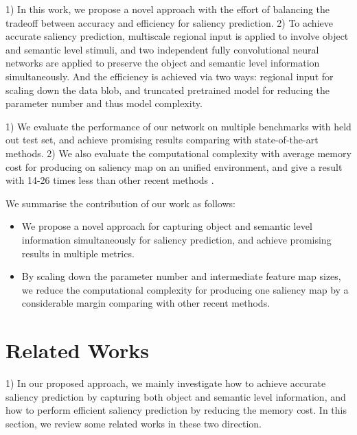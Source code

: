 \documentclass[twoside,twocolumn]{article}
\begin{document}
\par 1) In this work, we propose a novel approach with the effort of balancing the tradeoff between accuracy and efficiency for saliency prediction. 2) To achieve accurate saliency prediction, multiscale regional input is applied to involve object and semantic level stimuli, and two independent fully convolutional neural networks are applied to preserve the object and semantic level information simultaneously. And the efficiency is achieved via two ways: regional input for scaling down the data blob, and truncated pretrained model for reducing the parameter number and thus model complexity.

\par 1) We evaluate the performance of our network on multiple benchmarks with held out test set, and achieve promising results comparing with state-of-the-art methods. 2) We also evaluate the computational complexity with average memory cost for producing on saliency map on an unified environment, and give a result with 14-26 times less than other recent methods \cite{}.

\par We summarise the contribution of our work as follows:
\begin{itemize}
\item We propose a novel approach for capturing object and semantic level information simultaneously for saliency prediction, and achieve promising results in multiple metrics.
\item By scaling down the parameter number and intermediate feature map sizes, we reduce the computational complexity for producing one saliency map by a considerable margin comparing with other recent methods.
\end{itemize}  

\section{Related Works}

\par 1) In our proposed approach, we mainly investigate how to achieve accurate saliency prediction by capturing both object and semantic level information, and how to perform efficient saliency prediction by reducing the memory cost. In this section, we review some related works in these two direction.
\end{document}
